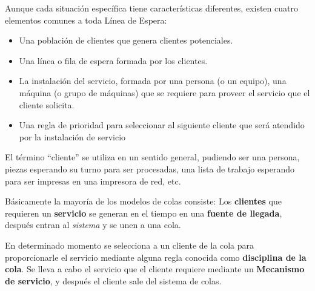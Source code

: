 \documentclass{article}
\begin{document}
Aunque cada situación específica tiene características diferentes, existen cuatro elementos comunes a toda Línea de Espera:
\begin{itemize}
    \item Una población de clientes que genera clientes potenciales.

    \item Una línea o fila de espera formada por los clientes.

    \item La instalación del servicio, formada por una persona (o un equipo), una máquina (o grupo de máquinas) que se requiere para proveer el servicio que el cliente solicita.

    \item Una regla de prioridad para seleccionar al siguiente cliente que será atendido por la instalación de servicio
\end{itemize}

El término ``cliente'' se utiliza en un sentido general, pudiendo ser una persona, piezas esperando su turno para ser procesadas, una lista de trabajo esperando para ser impresas en una impresora de red, etc.

Básicamente la mayoría de los modelos de colas consiste: Los \textbf{clientes} que requieren un \textbf{servicio} se generan en el tiempo en una \textbf{fuente de llegada}, después entran al \textit{sistema} y se unen a una cola. 

En determinado momento se selecciona a un cliente de la cola para proporcionarle el servicio mediante alguna regla conocida como \textbf{disciplina de la cola}. Se lleva a cabo el servicio que el cliente requiere mediante un \textbf{Mecanismo de servicio}, y después el cliente sale del sistema de colas.
\end{document}
